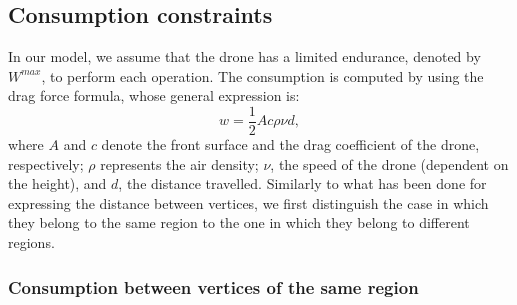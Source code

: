 \documentclass[12pt]{elsarticle}
\begin{document}

\subsection{Consumption constraints}
In our model, we assume that the drone has a limited endurance, denoted by $W^{max}$, to perform each operation. The consumption is computed by using the drag force formula, whose general expression is:
$$
w = \frac{1}{2}Ac\rho\nu d,
$$
where $A$ and $c$ denote the front surface and the drag coefficient of the drone, respectively; $\rho$ represents the air density; $\nu$, the speed of the drone (dependent on the height), and $d$, the distance travelled.
Similarly to what has been done for expressing the distance between vertices, we first distinguish the case in which they belong to the same region to the one in which they belong to different regions.

\subsubsection{Consumption between vertices of the same region}
\end{document}
